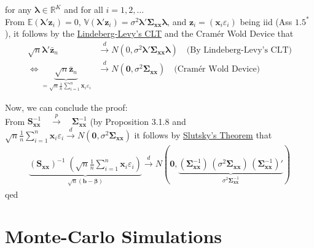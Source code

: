 \documentclass[
]{book}
\begin{document}
for any \(\boldsymbol{\lambda}\in\mathbb{R}^{K}\) and for all
\(i=1,2,\dots\)\\
From \(\mathbb{E}(\boldsymbol{\lambda}'\mathbf{z}_i)=0\),
\(\mathbb{V}(\boldsymbol{\lambda}'\mathbf{z}_i)=\sigma^2\boldsymbol{\lambda}'\boldsymbol{\Sigma}_{\mathbf{x}\mathbf{x}}\boldsymbol{\lambda}\),
and \(\mathbf{z}_i=(\mathbf{x}_i\varepsilon_i)\) being iid (Ass
\(1.5^\ast\)), it follows by the \href{https://www.statlect.com/asymptotic-theory/central-limit-theorem}{Lindeberg-Levy's CLT}
and the Cramér Wold Device that
\begin{align*}
\sqrt{n}\boldsymbol{\lambda}'\bar{\mathbf{z}}_n&\overset{d}\longrightarrow N(0,\sigma^2\boldsymbol{\lambda}'\boldsymbol{\Sigma}_{\mathbf{x}\mathbf{x}}\boldsymbol{\lambda})\quad\text{(By Lindeberg-Levy's CLT)}\\
\Leftrightarrow
\underbrace{\sqrt{n}\bar{\mathbf{z}}_n}_{=\sqrt{n}\frac{1}{n}\sum_{i=1}^n\mathbf{x}_i\varepsilon_i}&\overset{d}\longrightarrow N(\mathbf{0},\sigma^2\boldsymbol{\Sigma}_{\mathbf{x}\mathbf{x}})\quad\text{(Cramér Wold Device)}
\end{align*}

Now, we can conclude the proof:\\
From
\(\mathbf{S}_{\mathbf{x}\mathbf{x}}^{-1}\quad\overset{p}\longrightarrow \quad\boldsymbol{\Sigma}_{\mathbf{x}\mathbf{x}}^{-1}\)
(by Proposition 3.1.8 and\\
\(\sqrt{n}\frac{1}{n}\sum_{i=1}^n\mathbf{x}_i\varepsilon_i\overset{d}\longrightarrow N(\mathbf{0},\sigma^2\boldsymbol{\Sigma}_{\mathbf{x}\mathbf{x}})\)
it follows by \href{https://www.statlect.com/asymptotic-theory/Slutsky-theorem}{Slutsky's Theorem}
that
\begin{align*}
\underbrace{\left(\mathbf{S}_{\mathbf{x}\mathbf{x}}\right)^{-1}\;\left(\sqrt{n}\frac{1}{n}\sum_{i=1}^n\mathbf{x}_i\varepsilon_i\right)}_{\sqrt{n}(\mathbf{b}-\boldsymbol{\beta})}\overset{d}\longrightarrow N\left(\mathbf{0},\underbrace{(\boldsymbol{\Sigma}_{\mathbf{x}\mathbf{x}}^{-1})\,(\sigma^2\boldsymbol{\Sigma}_{\mathbf{x}\mathbf{x}})\,(\boldsymbol{\Sigma}_{\mathbf{x}\mathbf{x}}^{-1})'}_{\sigma^2\boldsymbol{\Sigma}^{-1}_{\mathbf{x}\mathbf{x}}}\right)
\end{align*}
qed

\hfill\break

\hypertarget{monte-carlo-simulations}{%
\chapter{Monte-Carlo Simulations}\label{monte-carlo-simulations}}
\end{document}

